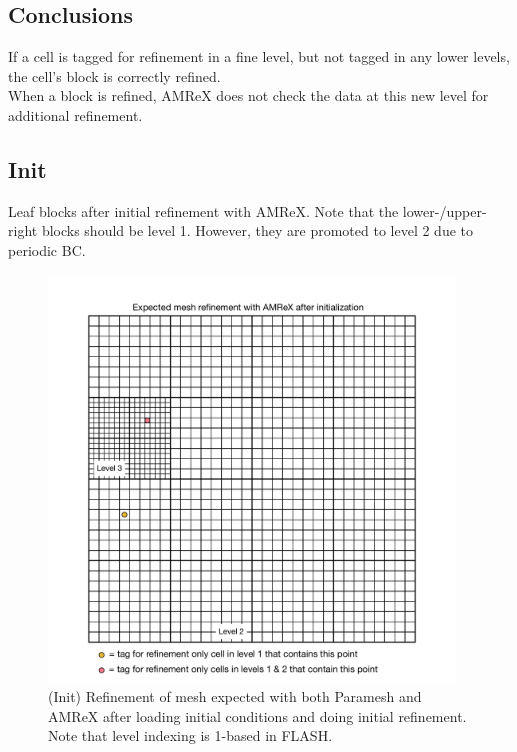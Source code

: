 \documentclass[12pt,letterpaper]{article}
\begin{document}
\subsection{Conclusions}
If a cell is tagged for refinement in a fine level, but not tagged in any lower
levels, the cell's block is correctly refined.\\

When a block is refined, AMReX does not check the data at this new level for
additional refinement.

\newpage
\subsection{Init}
Leaf blocks after initial refinement with AMReX.  Note that the
lower-/upper-right blocks should be level 1.  However, they are promoted to
level 2 due to periodic BC.
\begin{figure}[!hp]
\begin{center}
\includegraphics[width=4.25in]{TestRefine_Init_Both.pdf}
\caption{(Init) Refinement of mesh expected with both Paramesh and AMReX after loading
initial conditions and doing initial refinement.  Note that level indexing is
1-based in FLASH.}
\end{center}
\end{figure}

\newpage
\end{document}

